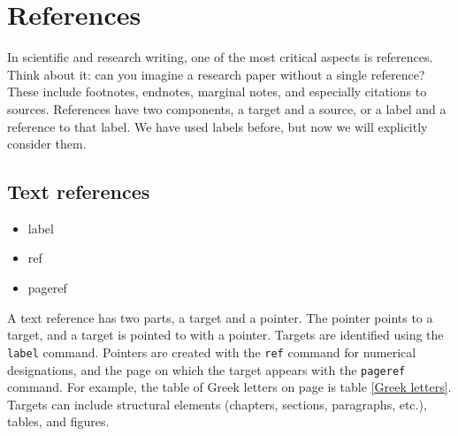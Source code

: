     
    \section{References}
    \label{References}

    In scientific and research writing, one of the most critical aspects is references. Think about it: can you imagine a research paper without a single reference? These include footnotes, endnotes, marginal notes, and especially citations to sources. References have two components, a target and a source, or a label and a reference to that label. We have used labels before, but now we will explicitly consider them.

    \subsection{Text references}
    \label{Text references}

        \begin{cmd}
            \begin{itemize}
                \item{label}
                \item{ref}
                \item{pageref}
            \end{itemize}
        \end{cmd}

        A text reference has two parts, a target and a pointer. The pointer points to a target, and a target is pointed to with a pointer. Targets are identified using the \texttt{label} command. Pointers are created with the \texttt{ref} command for numerical designations, and the page on which the target appears with the \texttt{pageref} command. For example, the table of Greek letters on page \pageref{Greek letters} is table \ref{Greek letters}. Targets can include structural elements (chapters, sections, paragraphs, etc.), tables, and figures.

